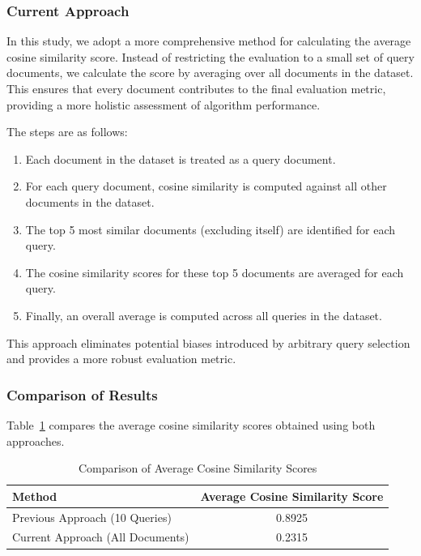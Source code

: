 \documentclass[12pt]{article}
\begin{document}
\subsubsection{Current Approach}

In this study, we adopt a more comprehensive method for calculating the average cosine similarity score. Instead of restricting the evaluation to a small set of query documents, we calculate the score by averaging over all documents in the dataset. This ensures that every document contributes to the final evaluation metric, providing a more holistic assessment of algorithm performance.

The steps are as follows:
\begin{enumerate}
    \item Each document in the dataset is treated as a query document.
    \item For each query document, cosine similarity is computed against all other documents in the dataset.
    \item The top 5 most similar documents (excluding itself) are identified for each query.
    \item The cosine similarity scores for these top 5 documents are averaged for each query.
    \item Finally, an overall average is computed across all queries in the dataset.
\end{enumerate}


This approach eliminates potential biases introduced by arbitrary query selection and provides a more robust evaluation metric.

\subsubsection{Comparison of Results}

Table~\ref{tab:cosine-similarity-comparison} compares the average cosine similarity scores obtained using both approaches.

\begin{table}[h!]
    \centering
    \caption{Comparison of Average Cosine Similarity Scores}
    \label{tab:cosine-similarity-comparison}
    \begin{tabular}{|l|c|}
        \hline
        \textbf{Method} & \textbf{Average Cosine Similarity Score} \\ 
        \hline
        Previous Approach (10 Queries) & 0.8925 \\ 
        Current Approach (All Documents) & 0.2315 \\ 
        \hline
    \end{tabular}
\end{table}
\end{document}
